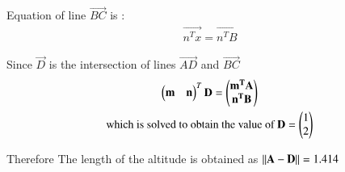 \begin{enumerate}[label=\thesection.\arabic*.,ref=\thesection.\theenumi]
	Equation of line $\vec{BC}$ is :
	\begin{align}
		\vec{n^Tx} = \vec{n^TB}
	\end{align}
	
	Since $\vec{D}$ is the intersection of lines $\vec{AD}$ and $\vec{BC}$ 
	\begin{multline}
		\begin{pmatrix}\mathbf{m}&\mathbf{n}\end{pmatrix}^T \mathbf{D}= \begin{pmatrix}\mathbf{m^TA}\\\mathbf{n^TB}\end{pmatrix}
		\\
	\text{which is solved to obtain the value of }\mathbf{D} = \begin{pmatrix}1\\2\end{pmatrix}
	\end{multline}
	
	Therefore  The length of the altitude is obtained as $\left\lVert\mathbf{A-D}\right\rVert = 1.414$
	
	
	
	
\end{enumerate}
